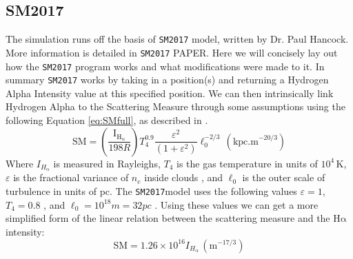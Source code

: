 \documentclass[a4paper, 10pt]{article}
\def\halpha{$\mathrm{H\alpha}$\;}
\def\sm{\texttt{SM2017}}
\begin{document}
\subsection{SM2017}\label{sec:SM2017}
The simulation runs off the basis of \texttt{SM2017} model, written by Dr. Paul Hancock. More information is detailed in \texttt{SM2017} PAPER\citet{H18}. Here we will concisely lay out how the \texttt{SM2017} program works and what modifications were made to it. In summary \texttt{SM2017} works by taking in a position(s) and returning a Hydrogen Alpha Intensity value at this specified position. We can then intrinsically link Hydrogen Alpha to the Scattering Measure through some assumptions using the following Equation \ref{eq:SMfull}, as described in \citet{Haffner}.
\begin{equation}
\mathrm{SM} = \left(\frac{\mathrm{I_{H_\alpha}}}{198R}\right)T_4^{0.9}\frac{\varepsilon^{2}}{(1+\varepsilon^2)}\ell_0^{-2/3}\, (\mathrm{kpc.m}^{-20/3})
\label{eq:SMfull}
\end{equation}
Where $I_{H_\alpha}$ is measured in Rayleighs, $T_4$ is the gas temperature in units of $10^4$\,K, $\varepsilon$ is the fractional variance of $n_e$ inside clouds , and $\ell_0$ is the outer scale of turbulence in units of pc.
The \sm model uses the following values $\varepsilon = 1$,  $T_4=0.8$ \citep{Haffner}, and $\ell_0 = 10^{18}m = 32pc$ \citep{Armstrong}.
Using these values we can get a more simplified form of the linear relation between the scattering measure and the \halpha{} intensity:
\begin{equation}
\mathrm{SM} = 1.26\times 10^{16} I_{H_\alpha}\, (\mathrm{m}^{-17/3})
\label{eq:SMshort}
\end{equation}
\end{document}
